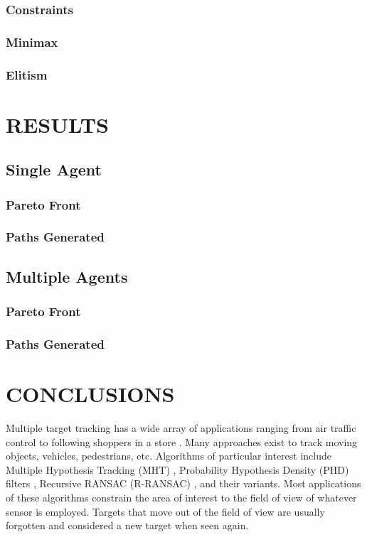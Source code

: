 \documentclass[letterpaper, 10 pt, conference]{ieeeconf}  %
\begin{document}
\subsubsection{Constraints}
\subsubsection{Minimax}
\subsubsection{Elitism}
\section{RESULTS}\label{results}
\subsection{Single Agent}
\subsubsection{Pareto Front}
\subsubsection{Paths Generated}
\subsection{Multiple Agents}
\subsubsection{Pareto Front}
\subsubsection{Paths Generated}
\section{CONCLUSIONS}\label{conclusions}

Multiple target tracking has a wide array of applications ranging from air traffic control \cite{Li1993} to following shoppers in a store \cite{Liu2007}. Many approaches exist to track moving objects, vehicles, pedestrians, etc. Algorithms of particular interest include Multiple Hypothesis Tracking (MHT) \cite{Reid1979}, Probability Hypothesis Density (PHD) filters \cite{Clark2007}, Recursive RANSAC (R-RANSAC) \cite{Niedfeldt2014}, and their variants. Most applications of these algorithms constrain the area of interest to the field of view of whatever sensor is employed. Targets that move out of the field of view are usually forgotten and considered a new target when seen again.
\end{document}
